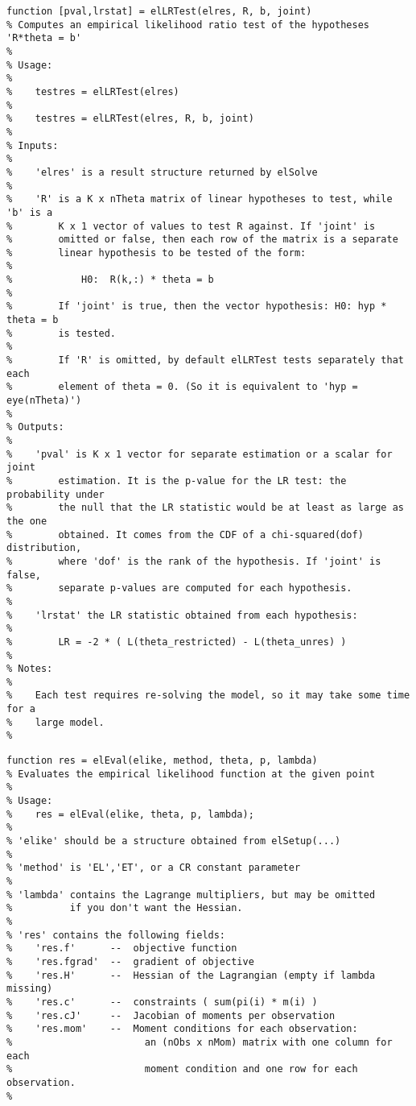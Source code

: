 \begin{lstlisting}[commentstyle=\ttfamily]
function [pval,lrstat] = elLRTest(elres, R, b, joint)
% Computes an empirical likelihood ratio test of the hypotheses 'R*theta = b'
%
% Usage:
%
%    testres = elLRTest(elres)
% 
%    testres = elLRTest(elres, R, b, joint)
%
% Inputs:
%
%    'elres' is a result structure returned by elSolve
%
%    'R' is a K x nTheta matrix of linear hypotheses to test, while 'b' is a
%        K x 1 vector of values to test R against. If 'joint' is
%        omitted or false, then each row of the matrix is a separate
%        linear hypothesis to be tested of the form:
%
%            H0:  R(k,:) * theta = b
%
%        If 'joint' is true, then the vector hypothesis: H0: hyp * theta = b
%        is tested.
%
%        If 'R' is omitted, by default elLRTest tests separately that each
%        element of theta = 0. (So it is equivalent to 'hyp = eye(nTheta)')
%
% Outputs:
%
%    'pval' is K x 1 vector for separate estimation or a scalar for joint
%        estimation. It is the p-value for the LR test: the probability under
%        the null that the LR statistic would be at least as large as the one
%        obtained. It comes from the CDF of a chi-squared(dof) distribution,
%        where 'dof' is the rank of the hypothesis. If 'joint' is false,
%        separate p-values are computed for each hypothesis.
%
%    'lrstat' the LR statistic obtained from each hypothesis:
%
%        LR = -2 * ( L(theta_restricted) - L(theta_unres) )
%
% Notes:
%
%    Each test requires re-solving the model, so it may take some time for a
%    large model.
%
\end{lstlisting}


\begin{lstlisting}[commentstyle=\ttfamily]
function res = elEval(elike, method, theta, p, lambda)
% Evaluates the empirical likelihood function at the given point
%
% Usage:
%    res = elEval(elike, theta, p, lambda);
%
% 'elike' should be a structure obtained from elSetup(...)
%
% 'method' is 'EL','ET', or a CR constant parameter
%
% 'lambda' contains the Lagrange multipliers, but may be omitted
%          if you don't want the Hessian.
%
% 'res' contains the following fields:
%    'res.f'      --  objective function
%    'res.fgrad'  --  gradient of objective
%    'res.H'      --  Hessian of the Lagrangian (empty if lambda missing)
%    'res.c'      --  constraints ( sum(pi(i) * m(i) )
%    'res.cJ'     --  Jacobian of moments per observation
%    'res.mom'    --  Moment conditions for each observation:
%                       an (nObs x nMom) matrix with one column for each
%                       moment condition and one row for each observation.
%
\end{lstlisting}

